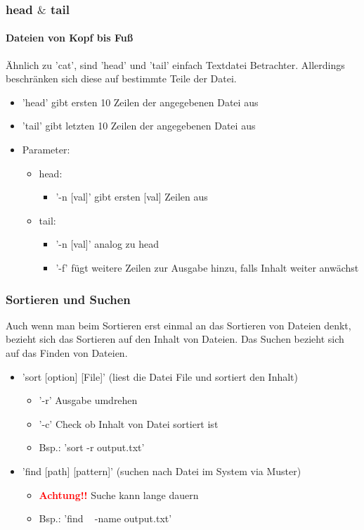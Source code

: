 \documentclass[12pt,utf8, handout]{beamer}
\begin{document}
\begin{frame}
\frametitle{head $\&$ tail}
\framesubtitle{\textcolor{ownDarkOr}{Dateien von Kopf bis Fuß}}
Ähnlich zu 'cat', sind 'head' und 'tail' einfach Textdatei Betrachter. Allerdings beschränken sich diese auf bestimmte Teile der Datei.
\begin{itemize}
	\item 'head' gibt ersten 10 Zeilen der angegebenen Datei aus
	\item 'tail' gibt letzten 10 Zeilen der angegebenen Datei aus
	\item Parameter:
	\begin{itemize}
		\item head:
		\begin{itemize}[<+->]
			\item {\scriptsize '-n [val]' gibt ersten [val] Zeilen aus }
		\end{itemize}
		\item tail:
		\begin{itemize}[<+->]
			\item {\scriptsize '-n [val]' analog zu head}
			\item {\scriptsize '-f' fügt weitere Zeilen zur Ausgabe hinzu, falls Inhalt weiter anwächst}
		\end{itemize}
	\end{itemize}
\end{itemize}
\end{frame}

\begin{frame}
\frametitle{Sortieren und Suchen}
Auch wenn man beim Sortieren erst einmal an das Sortieren von Dateien denkt,
bezieht sich das Sortieren auf den Inhalt von Dateien.
Das Suchen bezieht sich auf das Finden von Dateien.
\begin{itemize}[<+->]
	\item 'sort [option] [File]' (liest die Datei File und sortiert den Inhalt)
	\begin{itemize}[<+->]
		\item '-r' Ausgabe umdrehen
		\item '-c' Check ob Inhalt von Datei sortiert ist
		\item Bsp.: 'sort -r output.txt'
	\end{itemize}
	\item 'find [path] [pattern]' (suchen nach Datei im System via Muster)
	\begin{itemize}[<+->]
		\item \textbf{\textcolor{red}{Achtung!!}} Suche kann lange dauern
		\item Bsp.: 'find ~ -name output.txt'
	\end{itemize}
\end{itemize}
\end{frame}
\end{document}
